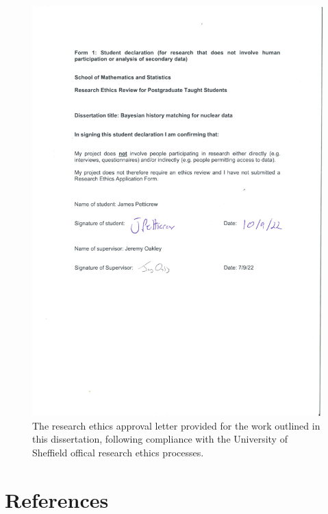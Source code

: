 \documentclass[
  12pt,
  a4paper,
  twoside]{book}
\begin{document}
\begin{figure}[H]

{\centering \includegraphics[width=1\linewidth]{figures/declaration} 

}

\caption{The research ethics approval letter provided for the work outlined in this dissertation, following compliance with the University of Sheffield offical research ethics processes.}\label{fig:ethicsapprov}
\end{figure}

\hypertarget{references}{%
\chapter*{References}\label{references}}
\end{document}
